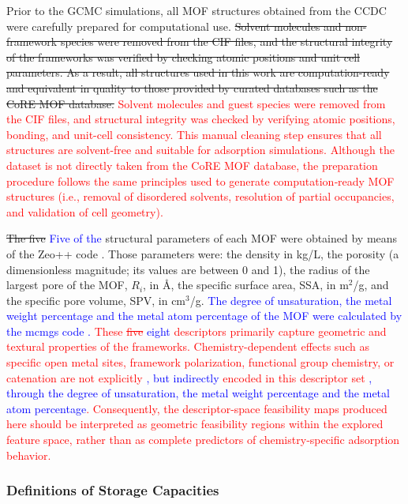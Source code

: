 \documentclass[review]{elsarticle}
\begin{document}
Prior to the GCMC simulations, all MOF structures obtained from the CCDC were carefully prepared for computational use. 
\sout{Solvent molecules and non-framework species were removed from the CIF files, and the structural integrity of the frameworks was verified by checking atomic positions and unit cell parameters. As a result, all structures used in this work are computation-ready and equivalent in quality to those provided by curated databases such as the CoRE MOF database.}
\textcolor{red}{Solvent molecules and guest species were removed from the CIF files, and structural integrity was checked by verifying atomic positions, bonding, and unit-cell consistency. This manual cleaning step ensures that all structures are solvent-free and suitable for adsorption simulations. Although the dataset is not directly taken from the CoRE MOF database, the preparation procedure follows the same principles used to generate computation‑ready MOF structures (i.e., removal of disordered solvents, resolution of partial occupancies, and validation of cell geometry).}
 
\sout{The five} \textcolor{blue}{Five of the} structural parameters of each MOF 
were obtained by means of the Zeo++ code \cite{zeoplusplus}. Those parameters 
were: the density in kg/L, the porosity (a dimensionless magnitude; its values 
are between 0 and 1), the radius of the largest pore of the MOF, $R_i$, in 
\AA{}, the specific surface area, SSA, in m$^2$/g, and the specific pore 
volume, SPV, in cm$^3$/g. \textcolor{blue}{The degree of unsaturation, the 
metal weight percentage and the metal atom percentage of the MOF were 
calculated by the mcmgs code \cite{mcmgs}.} \textcolor{red}{These \sout{five} 
\textcolor{blue}{eight} descriptors primarily capture geometric and textural 
properties of the frameworks. Chemistry-dependent effects such as specific open 
metal sites, framework polarization, functional group chemistry, or catenation 
are not explicitly \textcolor{blue}{, but indirectly} encoded in this 
descriptor set \textcolor{blue}{, through the degree of unsaturation, the
metal weight percentage and the metal atom percentage}. Consequently, the 
descriptor-space feasibility maps produced here should be interpreted as 
geometric feasibility regions within the explored feature space, rather than as 
complete predictors of chemistry‑specific adsorption behavior.
}



\subsubsection{Definitions of Storage Capacities}
\end{document}
